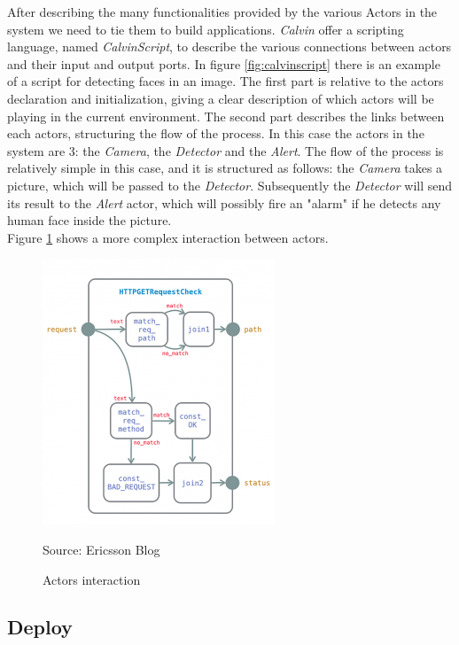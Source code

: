   After describing the many functionalities provided by the various Actors in the system
  we need to tie them to build applications. \textit{Calvin} offer a scripting language,
  named \textit{CalvinScript}, to describe the various connections between actors
  and their input and output ports. In figure \ref{fig:calvinscript} there is an example
  of a script for detecting faces in an image. The first part is relative to the actors declaration
  and initialization, giving a clear description of which actors will be playing in the current
  environment. The second part describes the links between each actors, structuring the flow
  of the process. In this case the actors in the system are 3: the \textit{Camera}, the \textit{Detector}
  and the \textit{Alert}. The flow of the process is relatively simple in this case, and it is structured
  as follows: the  \textit{Camera} takes a picture, which will be passed to the \textit{Detector}. Subsequently
  the \textit{Detector} will send its result to the \textit{Alert} actor, which will possibly fire an "alarm" if he
  detects any human face inside the picture.\\
  Figure \ref{fig:calvinactors} shows a more complex interaction between actors. %

  \begin{figure}[h]
  \caption{Actors interaction}

  \label{fig:calvinactors}
  \centering
  \includegraphics[scale=0.75]{calvin3.png}
  \par{Source: Ericsson Blog \cite{calvin2}}
  \end{figure}



\subsection{Deploy}

